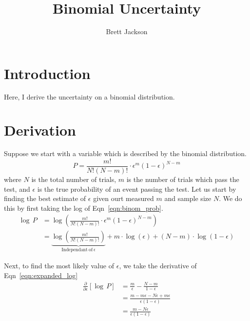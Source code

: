 \documentclass[12]{article}
\title{Binomial Uncertainty}
\author{Brett Jackson}
\begin{document}
\maketitle
\section{Introduction}
Here, I derive the uncertainty on a binomial distribution.

\section{Derivation}

Suppose we start with a variable which is described by the binomial distribution.
\begin{equation}
  \label{eqn:binom_prob}
  P = \frac{m!}{N!\left(N-m\right)!} \cdot \epsilon^{m}\left(1-\epsilon\right)^{N-m}
\end{equation}
where $N$ is the total number of trials, $m$ is the number of trials which pass the test, and $\epsilon$ is the true probability of an event passing the test.
Let us start by finding the best estimate of $\epsilon$ given ourt measured $m$ and sample size $N$.
We do this by first taking the log of Eqn~\ref{eqn:binom_prob}.
\begin{subequations}
  \begin{align}
    \log \, P
    & = \log \left(\frac{m!}{N!\left(N-m\right)!} \cdot \epsilon^{m}\left(1-\epsilon\right)^{N-m} \right) \\
    & = \underbrace{ \log \left(\frac{m!}{N!\left(N-m\right)!} \right) }_{\mathrm{Independant~ of~ } \epsilon}
      + m \cdot \log \left( \epsilon \right)
      + \left(N-m\right) \cdot \log \left( 1-\epsilon \right)
      \label{eqn:expanded_log}
  \end{align}
\end{subequations}

Next, to find the most likely value of $\epsilon$, we take the derivative of Eqn~\ref{eqn:expanded_log}
\begin{subequations}
  \begin{align}
    \frac{\partial}{\partial \epsilon} \left[ \log \, P \right]
    & = \frac{m}{\epsilon} - \frac{N-m}{1-\epsilon} \\
    & = \frac{m - m\epsilon - N\epsilon + m\epsilon}{\epsilon\left(1-\epsilon\right)} \\
    & = \frac{m - N\epsilon}{\epsilon\left(1-\epsilon\right)}
        \label{eqn:derivative_log}
  \end{align}
\end{subequations}
\end{document}

